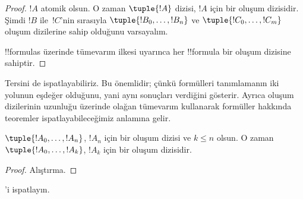 \begin{proof}
$!A$ atomik olsun. O zaman $\tuple{!A}$ dizisi, $!A$ için bir oluşum
dizisidir.
%
Şimdi $!B$ ile~$!C$'nin sırasıyla $\tuple{!B_0,\dotsc,!B_n}$ ve
$\tuple{!C_0,\dotsc,!C_m}$ oluşum dizilerine sahip olduğunu varsayalım.
%
\begin{enumerate}
\end{enumerate}
!!{formula}s üzerinde tümevarım ilkesi uyarınca her !!{formula} bir
oluşum dizisine sahiptir.
\end{proof}

Tersini de ispatlayabiliriz. Bu önemlidir; çünkü formülleri tanımlamanın
iki yolunun eşdeğer olduğunu, yani aynı sonuçları verdiğini gösterir.
Ayrıca oluşum dizilerinin uzunluğu üzerinde olağan tümevarım kullanarak
formüller hakkında teoremler ispatlayabileceğimiz anlamına gelir.

\begin{lem}
$\tuple{!A_0,\dotsc,!A_n}$, $!A_n$ için bir oluşum dizisi ve $k \leq n$
olsun. O zaman $\tuple{!A_0,\dotsc,!A_k}$, $!A_k$ için bir oluşum
dizisidir.
\end{lem}

\begin{proof}
Alıştırma.
\end{proof}

\begin{prob}
'i ispatlayın.
\end{prob}


